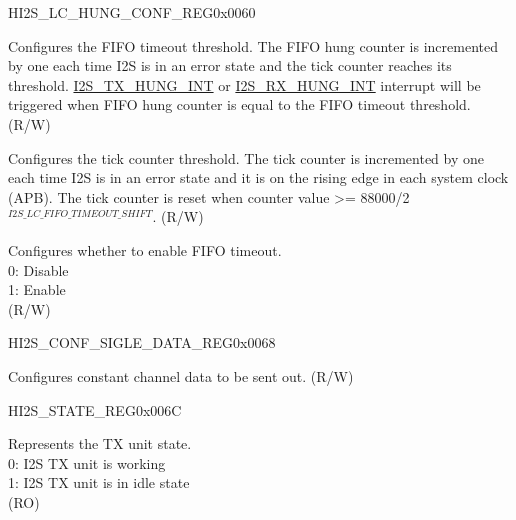\begin{register}{H}{I2S\_LC\_HUNG\_CONF\_REG}{0x0060}\label{regdesc:I2SLCHUNGCONFREG}
%
%
%
%
\regnewline%
\begin{regdesc}\begin{reglist}
\label{fielddesc:I2SLCFIFOTIMEOUT}\item [I2S\_LC\_FIFO\_TIMEOUT] Configures the FIFO timeout threshold. The FIFO hung counter is incremented by one each time I2S is in an error state and the tick counter reaches its threshold. \hyperref[int:I2STXHUNGINT]{I2S\_TX\_HUNG\_INT} or \hyperref[int:I2STXHUNGINT]{I2S\_RX\_HUNG\_INT} interrupt will be triggered when FIFO hung counter is equal to the FIFO timeout threshold. (R/W)
\label{fielddesc:I2SLCFIFOTIMEOUTSHIFT}\item [I2S\_LC\_FIFO\_TIMEOUT\_SHIFT] Configures the tick counter threshold. The tick counter is incremented by one each time I2S is in an error state and it is on the rising edge in each system clock (APB). The tick counter is reset when counter value >= 88000/2$^{I2S\_LC\_FIFO\_TIMEOUT\_SHIFT}$. (R/W)
\label{fielddesc:I2SLCFIFOTIMEOUTENA}\item [I2S\_LC\_FIFO\_TIMEOUT\_ENA] Configures whether to enable FIFO timeout. \\
0: Disable\\
1: Enable\\
(R/W)
\end{reglist}\end{regdesc}
\end{register}


\begin{register}{H}{I2S\_CONF\_SIGLE\_DATA\_REG}{0x0068}\label{regdesc:I2SCONFSIGLEDATAREG}
%
\regnewline%
\begin{regdesc}\begin{reglist}
\label{fielddesc:I2SSINGLEDATA}\item [I2S\_SINGLE\_DATA] Configures constant channel data to be sent out. (R/W)
\end{reglist}\end{regdesc}
\end{register}


\begin{register}{H}{I2S\_STATE\_REG}{0x006C}\label{regdesc:I2SSTATEREG}
%
%
\regnewline%
\begin{regdesc}\begin{reglist}
\label{fielddesc:I2STXIDLE}\item [I2S\_TX\_IDLE] Represents the TX unit state. \\
0: I2S TX unit is working\\
1: I2S TX unit is in idle state\\
(RO)
\end{reglist}\end{regdesc}
\end{register}


